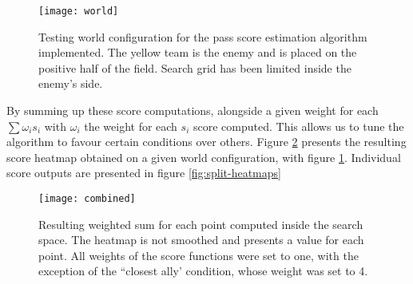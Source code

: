 \begin{figure}[h]
    \centering
    \texttt{[image: world]}
    \caption{Testing world configuration for the pass score estimation algorithm implemented. The yellow team is the enemy and
    is placed on  the positive half of the field. Search grid has been limited inside the enemy's side.}
    \label{fig:world-setup}
\end{figure}


By summing up these score computations, alongside a given weight for each $\sum{\omega_{i}s_i}$ with $\omega_i$ the weight for each $s_i$ score computed.
This allows us to tune the algorithm to favour certain conditions over others. Figure \ref{fig:combined} presents the resulting score heatmap obtained
on a given world configuration, with figure \ref{fig:world-setup}.
Individual score outputs are presented in figure \ref{fig:split-heatmaps}

\begin{figure}[h]
    \centering
    \texttt{[image: combined]}
    \caption{Resulting weighted sum for each point computed inside the search space. The heatmap is not smoothed
    and presents a value for each point. All weights of the score functions were set to one, with the exception of the ``closest ally' condition,
    whose weight was set to 4.}
    \label{fig:combined}
\end{figure}


